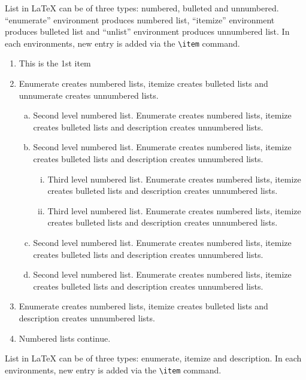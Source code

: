 \documentclass[numbers,webpdf]{ima-authoring-template}%
\theoremstyle{thmstyletwo}%
\numberwithin{equation}{section}
\begin{document}
List in \LaTeX{} can be of three types: numbered, bulleted and unnumbered. ``enumerate'' environment produces numbered list,
``itemize'' environment produces bulleted list and ``unlist'' environment produces unnumbered list.
In each environments, new entry is added via the \verb+\item+ command.
\begin{enumerate}[1.]
\item This is the 1st item

\item Enumerate creates numbered lists, itemize creates bulleted lists and
unnumerate creates unnumbered lists.
\begin{enumerate}[(a)]
\item Second level numbered list. Enumerate creates numbered lists, itemize creates bulleted lists and
description creates unnumbered lists.

\item Second level numbered list. Enumerate creates numbered lists, itemize creates bulleted lists and
description creates unnumbered lists.
\begin{enumerate}[(ii)]
\item Third level numbered list. Enumerate creates numbered lists, itemize creates bulleted lists and
description creates unnumbered lists.

\item Third level numbered list. Enumerate creates numbered lists, itemize creates bulleted lists and
description creates unnumbered lists.
\end{enumerate}

\item Second level numbered list. Enumerate creates numbered lists, itemize creates bulleted lists and
description creates unnumbered lists.

\item Second level numbered list. Enumerate creates numbered lists, itemize creates bulleted lists and
description creates unnumbered lists.
\end{enumerate}

\item Enumerate creates numbered lists, itemize creates bulleted lists and
description creates unnumbered lists.

\item Numbered lists continue.
\end{enumerate}
List in \LaTeX{} can be of three types: enumerate, itemize and description.
In each environments, new entry is added via the \verb+\item+ command.
\end{document}
